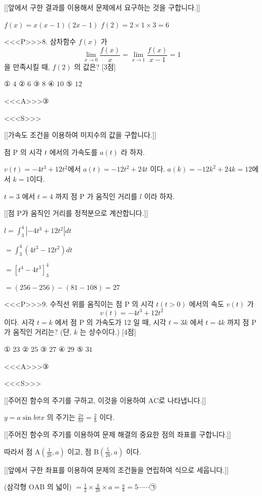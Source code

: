 \documentclass{oblivoir}
\begin{document}
[[앞에서 구한 결과를 이용해서 문제에서 요구하는 것을 구합니다.]]

$f(x)=x(x-1)(2 x-1)$
$f(2)=2 \times 1 \times 3=6$


<<<P>>>8. 삼차함수 $f(x)$ 가
$$
\lim _{x \rightarrow 0} \frac{f(x)}{x}=\lim _{x \rightarrow 1} \frac{f(x)}{x-1}=1
$$
을 만족시킬 때, $f(2)$ 의 값은? [3점]

① $4$
② $6$
③ $8$
④ $10$
⑤ $12$

<<<A>>>③

<<<S>>>

[[가속도 조건을 이용하여 미지수의 값을 구합니다.]]

점 $\mathrm{P}$ 의 시각 $t$ 에서의 가속도를 $a(t)$ 라 하자.

$v(t)=-4 t^{3}+12 t^{2}$에서 $a(t)=-12 t^{2}+24 t $ 이다.
$a(k)=-12 k^{2}+24 k=12$에서 $k=1$이다.

$t=3$ 에서 $t=4$ 까지 점 $\mathrm{P}$ 가 움직인 거리를 $l$ 이라 하자.

[[점 $\mathrm{P}$가 움직인 거리를 정적분으로 계산합니다.]]

$l =\int_{3}^{4}\left|-4 t^{3}+12 t^{2}\right| d t$

$=\int_{3}^{4}\left(4 t^{3}-12 t^{2}\right) d t$

$=\left[t^{4}-4 t^{3}\right]_{3}^{4}$

$=(256-256)-(81-108)=27$


<<<P>>>9. 수직선 위를 움직이는 점 $\mathrm{P}$ 의 시각 $t(t>0)$ 에서의 속도 $v(t)$ 가
$$
v(t)=-4 t^{3}+12 t^{2}
$$
이다. 시각 $t=k$ 에서 점 $\mathrm{P}$ 의 가속도가 12 일 때, 시각 $t=3 k$ 에서 $t=4 k$ 까지 점 $\mathrm{P}$ 가 움직인 거리는? (단, $k$ 는 상수이다.) [4점]

① $23$
② $25$
③ $27$
④ $29$
⑤ $31$

<<<A>>>③

<<<S>>>

[[주어진 함수의 주기를 구하고, 이것을 이용하여 $\overline{\mathrm{AC}}$로 나타냅니다.]]

$y=a \sin b \pi x$ 의 주기는 $\frac{2 \pi}{b \pi}=\frac{2}{b}$ 이다.

[[주어진 함수의 주기를 이용하여 문제 해결의 중요한 점의 좌표를 구합니다.]]

따라서 점 $\mathrm{A}\left(\frac{1}{2 b}, a\right)$ 이고, 점 $\mathrm{B}\left(\frac{5}{2 b}, a\right)$ 이다.

[[앞에서 구한 좌표를 이용하여 문제의 조건들을 연립하여 식으로 세웁니다.]]

(삼각형 $\mathrm{OAB}$ 의 넓이) $=\frac{1}{2} \times \frac{4}{2 b} \times a=\frac{a}{b}=5\cdots\cdots$㉠
\end{document}
